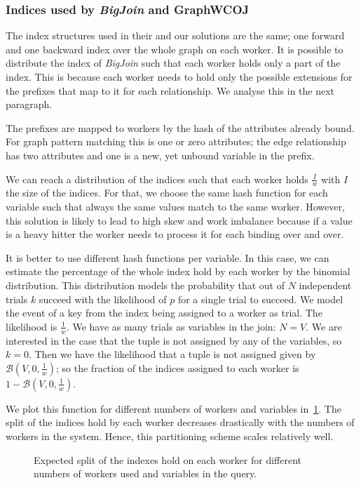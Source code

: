 \subsubsection{Indices used by \textit{BigJoin} and GraphWCOJ}
The index structures used in their and our solutions are the same; one forward and one backward index over the whole graph on each
worker.
It is possible to distribute the index of \textit{BigJoin} such that each worker holds only a part
of the index.
This is because each worker needs to hold only the possible extensions for the prefixes that map to it for each relationship.
We analyse this in the next paragraph.

The prefixes are mapped to workers by the hash of the attributes already bound.
For graph pattern matching this is one or zero attributes;
the edge relationship has two attributes and one is a new, yet unbound variable in the prefix.

We can reach a distribution of the indices such that each worker holds $\frac{I}{w}$ with $I$ the size of the indices.
For that, we choose the same hash function for each variable such that always the same values match to the same worker.
However, this solution is likely to lead to high skew and work imbalance because if a value is a heavy hitter the
worker needs to process it for each binding over and over.

It is better to use different hash functions per variable.
In this case, we can estimate the percentage of the whole index hold by each worker by the binomial distribution.
This distribution models the probability that out of $N$ independent trials $k$ succeed with the likelihood of $p$ for a single trial
to succeed.
We model the event of a key from the index being assigned to a worker as trial.
The likelihood is $\frac{1}{w}$.
We have as many trials as variables in the join: $N = V$.
We are interested in the case that the tuple is not assigned by any of the variables, so $k = 0$.
Then we have the likelihood that a tuple is not assigned given by $\mathcal{B} (V, 0, \frac{1}{w})$;
so the fraction of the indices assigned to each worker is $1 - \mathcal{B} (V, 0, \frac{1}{w})$.

We plot this function for different numbers of workers and variables in~\cref{fig:big-join-indices}.
The split of the indices hold by each worker decreases drastically with the numbers of workers in
the system.
Hence, this partitioning scheme scales relatively well.

\begin{figure}
    \centering
    
    \caption{Expected split of the indexes hold on each worker for different numbers of workers used
    and variables in the query.
    }
    \label{fig:big-join-indices}
\end{figure}

